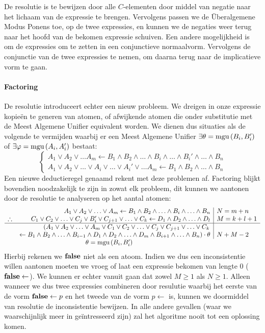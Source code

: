 De resolutie is te bewijzen door alle $C$-elementen door middel van negatie naar het lichaam van de expressie te brengen. Vervolgens passen we de \"Uberalgemene Modus Ponens toe, op de twee expressies, en kunnen we de negaties weer terug naar het hoofd van de bekomen expressie schuiven. Een andere mogelijkheid is om de expressies om te zetten in een conjunctieve normaalvorm. Vervolgens de conjunctie van de twee expressies te nemen, om daarna terug naar de implicatieve vorm te gaan.
\paragraph{Factoring}De resolutie introduceert echter een nieuw probleem. We dreigen in onze expressie kopie\"en te generen van atomen, of afwijkende atomen die onder substitutie met de Meest Algemene Unifier equivalent worden. We dienen dus situaties als de volgende te vermijden waarbij er een Meest Algemene Unifier $\exists\theta=\mbox{mgu}\left( B_i,B_i' \right)$ of $\exists\varphi=\mbox{mgu}\left( A_i,A_i' \right)$ bestaat:
\begin{equation}
\left\{\begin{array}{c}
A_1\vee A_2\vee\ldots A_m\leftarrow B_1\wedge B_2\wedge\ldots\wedge B_i\wedge\ldots\wedge B_i'\wedge\ldots\wedge B_n\\
A_1\vee A_2\vee\ldots\vee A_i\vee\ldots\vee A_i'\vee\ldots A_m\leftarrow B_1\wedge B_2\wedge\ldots\wedge B_n
\end{array}\right.
\label{eqn:factoringProblems}
\end{equation}
Een nieuwe deductieregel genaamd  rekent met deze problemen af. Factoring blijkt bovendien noodzakelijk te zijn in zowat elk probleem, dit kunnen we aantonen door de resolutie te analyseren op het aantal atomen:
\begin{equation}
\begin{array}{lr|l}
&A_1\vee A_2\vee\ldots\vee A_m\leftarrow B_1\wedge B_2\wedge\ldots\wedge B_i\wedge\ldots\wedge B_n&N=m+n\\
\therefore&C_1\vee C_2\vee\ldots\vee C_j\vee B_i'\vee C_{j+1}\vee\ldots\vee C_k\leftarrow D_1\wedge D_2\wedge\ldots\wedge D_l&M=k+l+1\\
\hline
&\left(A_1\vee A_2\vee\ldots\vee A_m\vee C_1\vee C_2\vee\ldots\vee C_j\vee C_{j+1}\vee\ldots\vee C_k\right.\\
&\left.\leftarrow B_1\wedge B_2\wedge\ldots\wedge B_{i-1}\wedge D_1\wedge D_2\wedge\ldots\wedge D_m\wedge B_{i+1}\wedge\ldots\wedge B_n\right)\cdot\theta&N+M-2\\
\multicolumn{2}{c}{\theta=\mathfunc{mgu}{B_i,B_i'}}
\end{array}
\end{equation}
Hierbij rekenen we $\mbox{\bf false}$ niet als een atoom. Indien we dus een inconsistentie willen aantonen moeten we vroeg of laat een expressie bekomen van lengte 0 ($\mbox{\bf false}\leftarrow$). We kunnen er echter vanuit gaan dat zowel $M\geq1$ als $N\geq1$. Alleen wanneer we dus twee expressies combineren door resulutie waarbij het eerste van de vorm $\mbox{\bf false}\leftarrow p$ en het tweede van de vorm $p\leftarrow$ is, kunnen we doormiddel van resolutie de inconsistentie bewijzen. In alle andere gevallen (waar we waarschijnlijk meer in ge\"intresseerd zijn) zal het algoritme nooit tot een oplossing komen.

